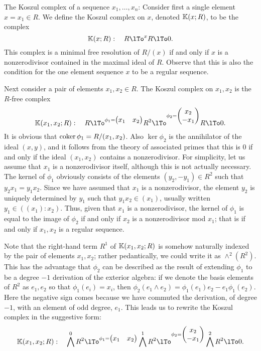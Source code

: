 \begin{example} The Koszul complex of a sequence $x_{1}, \dots, x_{n}$: 
Consider first a single element $x = x_{1}\in R$. We define the Koszul complex on $x$, denoted $\KK(x;R)$, to be the complex
$$
\KK(x; R): \quad R \lTo^{x} R \lTo 0.
$$
This complex is a minimal free resolution of $R/(x)$ if and only if $x$ is a nonzerodivisor contained in the maximal ideal of $R$. Observe that this is also the condition for the one element sequence $x$ to be a regular sequence.

Next consider 
a pair of elements $x_{1},x_{2}\in R$. The Koszul complex
on $x_{1},x_{2}$ is the $R$-free complex
$$
\KK(x_{1}, x_{2}; R): \quad R \lTo^{
\phi_{1}= \begin{pmatrix}
x_{1}&x_{2} 
\end{pmatrix}
} R^{2}\lTo ^{
\phi_{2}=\begin{pmatrix}
x_{2}\\-x_{1} 
\end{pmatrix}
}
R\lTo 0.
$$
It is obvious that $\coker \phi_{1} = R/(x_{1}, x_{2})$. Also $\ker \phi_{2}$ is the annihilator of the ideal $(x,y)$, and it follows from the theory of associated primes that this is 0 if and only if the ideal $(x_{1}, x_{2})$ contains a nonzerodivisor. For simplicity, let us assume that $x_{1}$ is a nonzerodivisor itself, although this is not actually necessary. The kernel of $\phi_{1}$ obviously consists of the elements $(y_{2},-y_{1})\in R^{2}$ such that $y_{2}x_{1} = y_{1}x_{2}$. Since we have assumed that $x_{1}$ is a nonzerodivisor,
the element $y_{2}$ is uniquely determined by $y_{1}$ such that $y_{1}x_{2} \in (x_{1})$, usually written 
$y_{1}\in ((x_{1}):x_{2})$. Thus, given that $x_{1}$ is a nonzerodivisor,
the kernel of $\phi_{1} $ is equal to the image of $\phi_{2}$ if and only if $x_{2}$ is a nonzerodivisor mod $x_{1}$; that is if and only if $x_{1},x_{2}$ is a regular sequence. 

Note that the right-hand term $R^{1}$ of $\KK(x_{1}, x_{2}; R)$ is somehow naturally indexed by the pair of elements $x_{1},x_{2}$; rather pedantically, we could write it as $\wedge^{2}(R^{2})$. This has the advantage that $\phi_{2}$ can be described as the result of extending $\phi_{1}$ to be a degree $-1$ derivation of the exterior algebra: if we denote the basis  elements of $R^{2}$ as $e_{1}, e_{2}$ so that $\phi_{1}(e_{i}) = x_{i}$, then
$\phi_{2}(e_{1}\wedge e_{2}) = \phi_{1}(e_{1})e_{2} - e_{1} \phi_{1}(e_{2})$. 
Here the negative sign comes because we have commuted the derivation, of degree $-1$, with an element of
odd degree, $e_{1}$. This leads us to rewrite the Koszul complex in the suggestive form:
$$
\KK(x_{1}, x_{2}; R): \quad \bigwedge^{0}R^{2} \lTo^{
\phi_{1}= \begin{pmatrix}
x_{1}&x_{2} 
\end{pmatrix}
} \bigwedge^{1}R^{2}\lTo ^{
\phi_{2}=\begin{pmatrix}
x_{2}\\-x_{1} 
\end{pmatrix}
}
\bigwedge^{2}R^{2}\lTo 0.
$$


\end{example}
